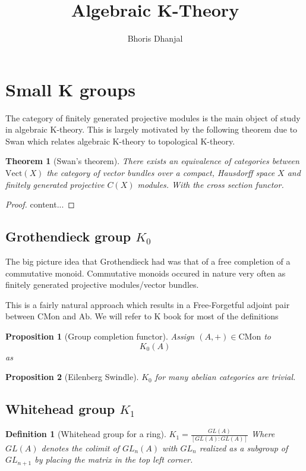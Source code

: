 \documentclass[12pt]{article}
\title{Algebraic K-Theory}
\author{Bhoris Dhanjal}
\numberwithin{equation}{section}
\newtheorem{theorem}{Theorem}[section]
\newtheorem{definition}{Definition}[section]
\newtheorem{proposition}{Proposition}[section]
\begin{document}
	\tableofcontents
	\maketitle
	\section{Small K groups}
	The category of finitely generated projective modules is the main object of study in algebraic K-theory. This is largely motivated by the following theorem due to Swan \cite{Swan1962} which relates algebraic K-theory to topological K-theory.
	\begin{theorem}[Swan's theorem]
		There exists an equivalence of categories between $\mathrm{Vect}(X)$ the category of vector bundles over a compact, Hausdorff space $X$ and finitely generated projective $C(X)$ modules. With the cross section functor.
	\end{theorem}
	\begin{proof}
		content...
	\end{proof}
	
	\subsection{Grothendieck group $K_0$}
	The big picture idea that Grothendieck had was that of a free completion of a commutative monoid. Commutative monoids occured in nature very often as finitely generated projective modules/vector bundles. 
	
	This is a fairly natural approach which results in a Free-Forgetful adjoint pair between $\mathrm{CMon}$ and $\mathrm{Ab}$. We will refer to K book for most of the definitions \cite{weibel2013k}
		
	\begin{proposition}[Group completion functor]
		Assign $(A,+) \in \mathrm{CMon} $ to \[K_0(A)\] as 
		
	\end{proposition}
	
	\begin{proposition}[Eilenberg Swindle]
		$K_0$ for many abelian categories are trivial.
	\end{proposition}
	\subsection{Whitehead group $K_1$}
	\begin{definition}[Whitehead group for a ring]
		$K_1= \frac{GL(A)}{[GL(A):GL(A)]}$
		Where $GL(A)$ denotes the colimit of $GL_n(A)$ with $GL_{n}$ realized as a subgroup of $GL_{n+1}$ by placing the matrix in the top left corner. 
	\end{definition}
	
\end{document}
